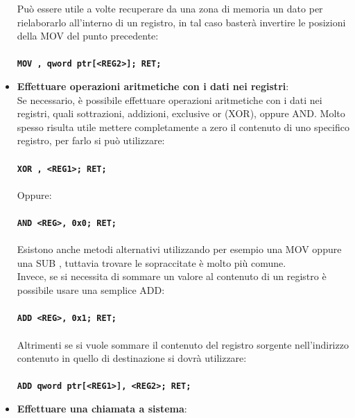 \begin{itemize}
        Può essere utile a volte recuperare da una zona di memoria un dato per rielaborarlo all'interno di un registro, in tal caso basterà invertire le posizioni della MOV del punto precedente:\\
        \\\texttt{\large{\textbf{\textcolor{Bittersweet}{MOV}  , qword ptr[<REG2>]; \space \textcolor{Bittersweet}{RET};}}}\\
    \item \textbf{Effettuare operazioni aritmetiche con i dati nei registri}:\\
        Se necessario, è possibile effettuare operazioni aritmetiche con i dati nei registri, quali sottrazioni, addizioni, exclusive or (XOR), oppure AND. Molto spesso risulta utile mettere completamente a zero il contenuto di uno specifico registro, per farlo
        si può utilizzare:\\
        \\\texttt{\large{\textbf{\textcolor{Bittersweet}{XOR}  , <REG1>; \space \textcolor{Bittersweet}{RET};}}}\\\\
        Oppure:\\
        \\\texttt{\large{\textbf{\textcolor{Bittersweet}{AND}  \space  <REG>, 0x0; \space \textcolor{Bittersweet}{RET};}}}\\\\
        Esistono anche metodi alternativi utilizzando per esempio una MOV oppure una SUB \cite*{ZEROED-register}, tuttavia trovare le sopraccitate è molto più comune.\\
        Invece, se si necessita di sommare un valore al contenuto di un registro è possibile usare una semplice ADD:\\
        \\\texttt{\large{\textbf{\textcolor{Bittersweet}{ADD}  \space  <REG>, 0x1; \space \textcolor{Bittersweet}{RET};}}}\\\\
        Altrimenti se si vuole sommare il contenuto del registro sorgente nell'indirizzo contenuto in quello di destinazione si dovrà utilizzare:\\
        \\\texttt{\large{\textbf{\textcolor{Bittersweet}{ADD}  \space  qword ptr[<REG1>], <REG2>; \space \textcolor{Bittersweet}{RET};}}}\\
    \item \textbf{Effettuare una chiamata a sistema}:\\

\end{itemize}
